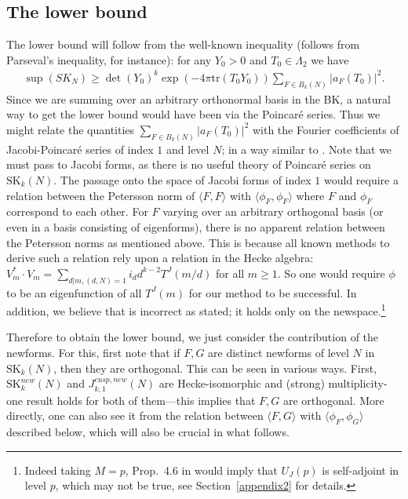 \documentclass[11pt]{amsart}
\numberwithin{equation}{section}
\theoremstyle{plain}
\theoremstyle{definition}
\newcommand{\mrm}{\mathrm}
\newcommand{\tr}{\mathrm{tr}}
\newcommand{\lan}{\langle }
\newcommand{\ran}{\rangle}
\newcommand{\sumn}{\sum \nolimits}
\newcommand{\skk}{\mrm{SK}_k}
\newcommand{\skkn}{\mrm{SK}_k(N)}
\begin{document}
\subsection{The lower bound}
The lower bound will follow from the well-known inequality (follows from Parseval's inequality, for instance):
for any $Y_0>0$ and $T_0 \in \Lambda_2$ we have
\begin{align} \label{sklbd}
    \sup(SK_N) \ge    \det(Y_0)^k \exp(-4 \pi \tr(T_0Y_0)) \sumn_{F \in B_k(N)} |a_F(T_0)|^2.
\end{align}
Since we are summing over an arbitrary orthonormal basis in the BK, a natural way to get the lower bound would have been via the Poincar\'e series. Thus we might relate the quantities $\sum_{F \in B_k(N) } |a_F(T_0)|^2$ with the Fourier coefficients of Jacobi-Poincar\'e series of index $1$ and level $N$; in a way similar to \cite{sd-hk}. Note that we must pass to Jacobi forms, as there is no useful theory of Poincar\'e series on $\skkn$.
The passage onto the space of Jacobi forms of index $1$ would require a relation between the Petersson norm of $\lan F,F \ran $ with $\lan \phi_F,\phi_F \ran $ where $F$ and $\phi_F$ correspond to each other. For $F$ varying over an arbitrary orthogonal basis (or even in a basis consisting of eigenforms), there is no apparent relation between the Petersson norms as mentioned above. This is because all known methods to derive such a relation rely upon a relation in the Hecke algebra: $V_m^* \cdot V_m = \sum_{d|m, (d,N)=1} i_d d^{k-2} T^J(m/d)$ for all $m \ge 1$. So one would require $\phi$ to be an eigenfunction of all $T^J(m)$ for our method to be successful. In addition, we believe that \cite[Prop.4.6]{Ag-Br} is incorrect as stated; it holds only on the newspace.\footnote{Indeed taking $M=p$, Prop.~4.6 in \cite{Ag-Br} would imply that $U_J(p)$  is self-adjoint in level $p$, which may not be true, see Section~\ref{appendix2} for details.}

Therefore to obtain the lower bound, we just consider the contribution of the newforms. For this, first note that if $F,G$ are distinct newforms of level $N$ in $\skkn$, then they are orthogonal. This can be seen in various ways. First, $\skk^{new}(N)$ and $J_{k,1}^{cusp,new}(N)$ are Hecke-isomorphic and (strong) multiplicity-one result holds for both of them—this implies that $F,G$ are orthogonal. More directly, one can also see it from the relation between $\lan F,G \ran $ with $\lan \phi_F,\phi_G \ran $ described below, which will also be crucial in what follows.
\end{document}
